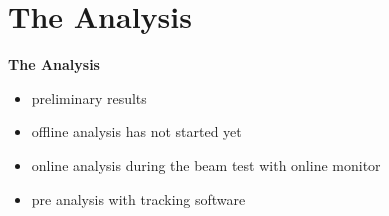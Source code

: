 \documentclass[9pt]{beamer}
\begin{document}
\section{The Analysis}
\begin{frame}
	\begin{alertblock}{
		\begin{center}
			\Large{\textbf{The Analysis}}
		\end{center}}
	\end{alertblock}
	\begin{itemize}
		\item preliminary results
		\item offline analysis has not started yet
		\item online analysis during the beam test with online monitor
		\item pre analysis with tracking software
	\end{itemize}
\end{frame}
\end{document}
